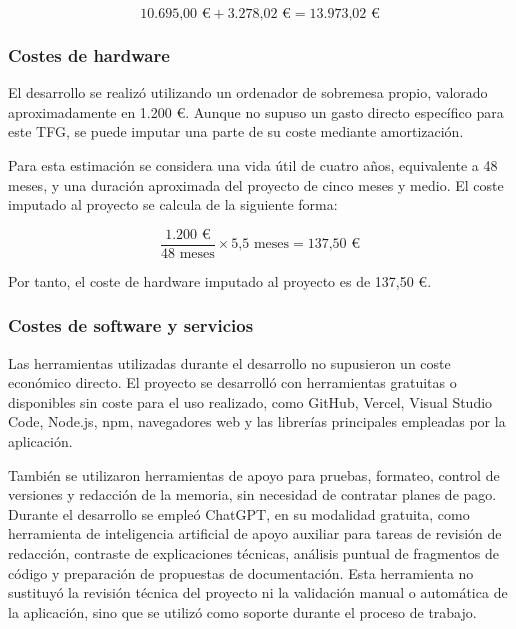 \begin{equation}
\text{10.695,00 €} + \text{3.278,02 €} = \text{13.973,02 €}
\end{equation}

\subsubsection{Costes de hardware}

El desarrollo se realizó utilizando un ordenador de sobremesa propio, valorado aproximadamente en 1.200 €. Aunque no supuso un gasto directo específico para este TFG, se puede imputar una parte de su coste mediante amortización.

Para esta estimación se considera una vida útil de cuatro años, equivalente a 48 meses, y una duración aproximada del proyecto de cinco meses y medio. El coste imputado al proyecto se calcula de la siguiente forma:

\begin{equation}
\frac{\text{1.200 €}}{\text{48 meses}} \times \text{5,5 meses} = \text{137,50 €}
\end{equation}

Por tanto, el coste de hardware imputado al proyecto es de 137,50 €.

\subsubsection{Costes de software y servicios}

Las herramientas utilizadas durante el desarrollo no supusieron un coste económico directo. El proyecto se desarrolló con herramientas gratuitas o disponibles sin coste para el uso realizado, como GitHub, Vercel, Visual Studio Code, Node.js, npm, navegadores web y las librerías principales empleadas por la aplicación.

También se utilizaron herramientas de apoyo para pruebas, formateo, control de versiones y redacción de la memoria, sin necesidad de contratar planes de pago. Durante el desarrollo se empleó ChatGPT, en su modalidad gratuita, como herramienta de inteligencia artificial de apoyo auxiliar para tareas de revisión de redacción, contraste de explicaciones técnicas, análisis puntual de fragmentos de código y preparación de propuestas de documentación. Esta herramienta no sustituyó la revisión técnica del proyecto ni la validación manual o automática de la aplicación, sino que se utilizó como soporte durante el proceso de trabajo.


